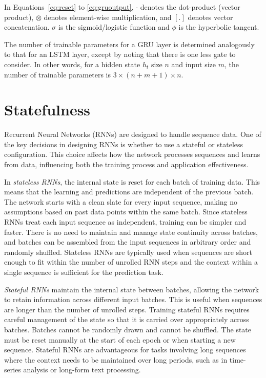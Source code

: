 In Equations~\ref{eq:reset} to \ref{eq:gruoutput}, $\cdot$ denotes the dot-product (vector product), $\otimes$ denotes element-wise multiplication, and $[.]$ denotes vector concatenation.  $\sigma$ is the sigmoid/logistic function and $\phi$ is the hyperbolic tangent.

The number of trainable parameters for a GRU layer is determined analogously to that for an LSTM layer, except by noting that there is one less gate to consider. In other words, for a hidden state $h_t$ size $n$ and input size $m$, the number of trainable parameters is $3 \times (n+m+1) \times n$.

\section{Statefulness}

Recurrent Neural Networks (RNNs) are designed to handle sequence data. One of the key decisions in designing RNNs is whether to use a stateful or stateless configuration. This choice affects how the network processes sequences and learns from data, influencing both the training process and application effectiveness.

In \emph{stateless RNNs}, the internal state is reset for each batch of training data. This means that the learning and predictions are independent of the previous batch. The network starts with a clean slate for every input sequence, making no assumptions based on past data points within the same batch. Since stateless RNNs treat each input sequence as independent, training can be simpler and faster. There is no need to maintain and manage state continuity across batches, and batches can be assembled from the input sequences in arbitrary order and randomly shuffled. Stateless RNNs are typically used when sequences are short enough to fit within the number of unrolled RNN steps and the context within a single sequence is sufficient for the prediction task.

\emph{Stateful RNNs} maintain the internal state between batches, allowing the network to retain information across different input batches. This is useful when sequences are longer than the number of unrolled steps. Training stateful RNNs requires careful management of the state so that it is carried over appropriately across batches. Batches cannot be randomly drawn and cannot be shuffled. The state must be reset manually at the start of each epoch or when starting a new sequence. Stateful RNNs are advantageous for tasks involving long sequences where the context needs to be maintained over long periods, such as in time-series analysis or long-form text processing.


